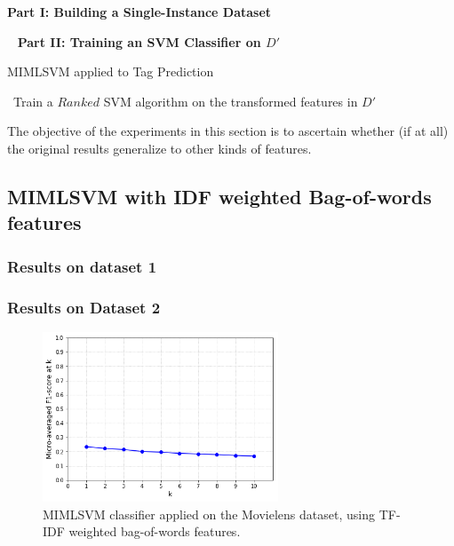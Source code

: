 \begin{algorithm}[H]
\LinesNotNumbered
{}
\BlankLine
 \textbf{Part I: Building a Single-Instance Dataset}
 
\ 
   \BlankLine
  \BlankLine
 \textbf{Part II: Training an SVM Classifier on $D'$}
 \caption{MIMLSVM applied to Tag Prediction \citep{shen_etal_2009} }
\ Train a $Ranked$ SVM algorithm on the transformed features in $D'$
\end{algorithm}

\hfill \break

The objective of the experiments in this section is to ascertain whether (if at all) the original results generalize to other kinds of features.

\subsection{MIMLSVM with IDF weighted Bag-of-words features}

\subsubsection{Results on dataset 1}

\subsubsection{Results on Dataset 2}

\begin{figure}[H]
    \centering
    \includegraphics[width=7cm]{chapters/05_experiments/images/mimlsvm-tf-idf-movielens.png}
    \caption{MIMLSVM classifier applied on the Movielens dataset, using TF-IDF weighted bag-of-words features.}
    \label{fig:knn_lda_movielens}
\end{figure}

